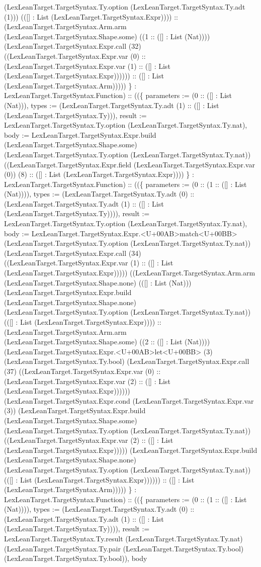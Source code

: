 \documentclass[11pt]{article}
\begin{document}
(LexLeanTarget.TargetSyntax.Ty.option (LexLeanTarget.TargetSyntax.Ty.adt (1))) (([] : List (LexLeanTarget.TargetSyntax.Expr)))) :: (LexLeanTarget.TargetSyntax.Arm.arm (LexLeanTarget.TargetSyntax.Shape.some) ((1 :: ([] : List (Nat)))) (LexLeanTarget.TargetSyntax.Expr.call (32) ((LexLeanTarget.TargetSyntax.Expr.var (0) :: (LexLeanTarget.TargetSyntax.Expr.var (1) :: ([] : List (LexLeanTarget.TargetSyntax.Expr)))))) :: ([] : List (LexLeanTarget.TargetSyntax.Arm))))) \} : LexLeanTarget.TargetSyntax.Function) :: ((\{ parameters := (0 :: ([] : List (Nat))), types := (LexLeanTarget.TargetSyntax.Ty.adt (1) :: ([] : List (LexLeanTarget.TargetSyntax.Ty))), result := LexLeanTarget.TargetSyntax.Ty.option (LexLeanTarget.TargetSyntax.Ty.nat), body := LexLeanTarget.TargetSyntax.Expr.build (LexLeanTarget.TargetSyntax.Shape.some) (LexLeanTarget.TargetSyntax.Ty.option (LexLeanTarget.TargetSyntax.Ty.nat)) ((LexLeanTarget.TargetSyntax.Expr.field (LexLeanTarget.TargetSyntax.Expr.var (0)) (8) :: ([] : List (LexLeanTarget.TargetSyntax.Expr)))) \} : LexLeanTarget.TargetSyntax.Function) :: ((\{ parameters := (0 :: (1 :: ([] : List (Nat)))), types := (LexLeanTarget.TargetSyntax.Ty.adt (0) :: (LexLeanTarget.TargetSyntax.Ty.adt (1) :: ([] : List (LexLeanTarget.TargetSyntax.Ty)))), result := LexLeanTarget.TargetSyntax.Ty.option (LexLeanTarget.TargetSyntax.Ty.nat), body := LexLeanTarget.TargetSyntax.Expr.<U+00AB>match<U+00BB> (LexLeanTarget.TargetSyntax.Ty.option (LexLeanTarget.TargetSyntax.Ty.nat)) (LexLeanTarget.TargetSyntax.Expr.call (34) ((LexLeanTarget.TargetSyntax.Expr.var (1) :: ([] : List (LexLeanTarget.TargetSyntax.Expr))))) ((LexLeanTarget.TargetSyntax.Arm.arm (LexLeanTarget.TargetSyntax.Shape.none) (([] : List (Nat))) (LexLeanTarget.TargetSyntax.Expr.build (LexLeanTarget.TargetSyntax.Shape.none) (LexLeanTarget.TargetSyntax.Ty.option (LexLeanTarget.TargetSyntax.Ty.nat)) (([] : List (LexLeanTarget.TargetSyntax.Expr)))) :: (LexLeanTarget.TargetSyntax.Arm.arm (LexLeanTarget.TargetSyntax.Shape.some) ((2 :: ([] : List (Nat)))) (LexLeanTarget.TargetSyntax.Expr.<U+00AB>let<U+00BB> (3) (LexLeanTarget.TargetSyntax.Ty.bool) (LexLeanTarget.TargetSyntax.Expr.call (37) ((LexLeanTarget.TargetSyntax.Expr.var (0) :: (LexLeanTarget.TargetSyntax.Expr.var (2) :: ([] : List (LexLeanTarget.TargetSyntax.Expr)))))) (LexLeanTarget.TargetSyntax.Expr.cond (LexLeanTarget.TargetSyntax.Expr.var (3)) (LexLeanTarget.TargetSyntax.Expr.build (LexLeanTarget.TargetSyntax.Shape.some) (LexLeanTarget.TargetSyntax.Ty.option (LexLeanTarget.TargetSyntax.Ty.nat)) ((LexLeanTarget.TargetSyntax.Expr.var (2) :: ([] : List (LexLeanTarget.TargetSyntax.Expr))))) (LexLeanTarget.TargetSyntax.Expr.build (LexLeanTarget.TargetSyntax.Shape.none) (LexLeanTarget.TargetSyntax.Ty.option (LexLeanTarget.TargetSyntax.Ty.nat)) (([] : List (LexLeanTarget.TargetSyntax.Expr)))))) :: ([] : List (LexLeanTarget.TargetSyntax.Arm))))) \} : LexLeanTarget.TargetSyntax.Function) :: ((\{ parameters := (0 :: (1 :: ([] : List (Nat)))), types := (LexLeanTarget.TargetSyntax.Ty.adt (0) :: (LexLeanTarget.TargetSyntax.Ty.adt (1) :: ([] : List (LexLeanTarget.TargetSyntax.Ty)))), result := LexLeanTarget.TargetSyntax.Ty.result (LexLeanTarget.TargetSyntax.Ty.nat) (LexLeanTarget.TargetSyntax.Ty.pair (LexLeanTarget.TargetSyntax.Ty.bool) (LexLeanTarget.TargetSyntax.Ty.bool)), body 
\end{document}
